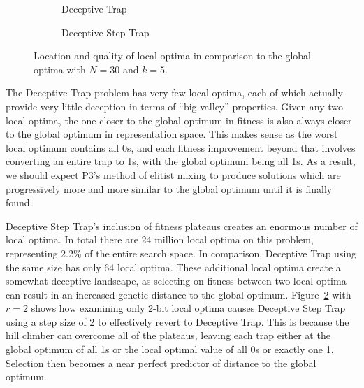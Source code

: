 \begin{figure}[t]
  \begin{centering}
    \begin{subfigure}{.44\textwidth}
      \begin{centering}
      \end{centering}
      \caption{Deceptive Trap}
      \label{fig-valley-dt}
    \end{subfigure}%
    \begin{subfigure}{.56\textwidth}
      \begin{centering}
      \end{centering}
      \caption{Deceptive Step Trap}
      \label{fig-valley-dst}
    \end{subfigure}
  \end{centering}
  \caption{Location and quality of local optima in comparison to the global optima with $N=30$ and $k=5$.}
  \label{fig-valley-trap}
\end{figure}

The Deceptive Trap problem has very few local optima, each of which actually
provide very little deception in terms of ``big valley'' properties. Given any two local optima, the one
closer to the global optimum in fitness is also always closer to the global optimum in representation space.
This makes sense as the worst local optimum contains all 0s, and each fitness improvement beyond that involves
converting an entire trap to 1s, with the global optimum being all 1s. As a result, we should expect P3's method
of elitist mixing to produce solutions which are progressively more and more similar to the global optimum until
it is finally found.

Deceptive Step Trap's inclusion of fitness plateaus creates an enormous number of local optima. In total there are 24
million local optima on this problem, representing 2.2\% of the entire search space. In comparison, Deceptive Trap using the
same size has only 64 local optima. These additional local optima create a somewhat deceptive landscape, as selecting
on fitness between two local optima can result in an increased genetic distance to the global optimum.
Figure~\ref{fig-valley-dst} with $r=2$ shows how examining only 2-bit local optima causes Deceptive Step Trap using
a step size of 2 to effectively revert to Deceptive Trap. This is because the hill climber can overcome all of the plateaus,
leaving each trap either at the global optimum of all 1s or the local optimal value of all 0s or exactly one 1. Selection then
becomes a near perfect predictor of distance to the global optimum.


